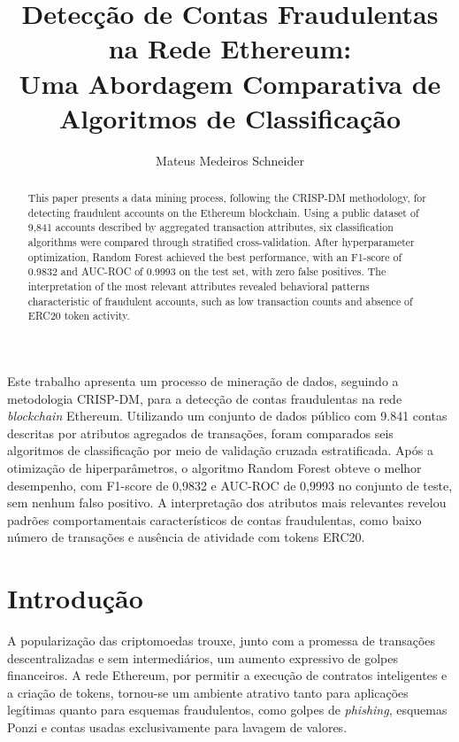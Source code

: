 \documentclass[12pt]{article}
\title{Detecção de Contas Fraudulentas na Rede Ethereum:\\ Uma Abordagem Comparativa de Algoritmos de Classificação}
\author{Mateus Medeiros Schneider\inst{1}}
\begin{document}
\renewcommand{\tablename}{Tabela}
\renewcommand{\figurename}{Figura}

\maketitle

\begin{abstract}
This paper presents a data mining process, following the CRISP-DM
methodology, for detecting fraudulent accounts on the Ethereum
blockchain. Using a public dataset of 9,841 accounts described by
aggregated transaction attributes, six classification algorithms were
compared through stratified cross-validation. After hyperparameter
optimization, Random Forest achieved the best performance, with an
F1-score of 0.9832 and AUC-ROC of 0.9993 on the test set, with zero
false positives. The interpretation of the most relevant attributes
revealed behavioral patterns characteristic of fraudulent accounts,
such as low transaction counts and absence of ERC20 token activity.
\end{abstract}

\begin{resumo}
Este trabalho apresenta um processo de mineração de dados, seguindo a
metodologia CRISP-DM, para a detecção de contas fraudulentas na rede
\textit{blockchain} Ethereum. Utilizando um conjunto de dados público
com 9.841 contas descritas por atributos agregados de transações, foram
comparados seis algoritmos de classificação por meio de validação
cruzada estratificada. Após a otimização de hiperparâmetros, o algoritmo
Random Forest obteve o melhor desempenho, com F1-score de 0,9832 e
AUC-ROC de 0,9993 no conjunto de teste, sem nenhum falso positivo. A
interpretação dos atributos mais relevantes revelou padrões
comportamentais característicos de contas fraudulentas, como baixo
número de transações e ausência de atividade com tokens ERC20.
\end{resumo}

\section{Introdução}

A popularização das criptomoedas trouxe, junto com a promessa de
transações descentralizadas e sem intermediários, um aumento expressivo
de golpes financeiros. A rede Ethereum, por permitir a execução de
contratos inteligentes e a criação de tokens, tornou-se um ambiente
atrativo tanto para aplicações legítimas quanto para esquemas
fraudulentos, como golpes de \textit{phishing}, esquemas Ponzi e
contas usadas exclusivamente para lavagem de valores.
\end{document}
